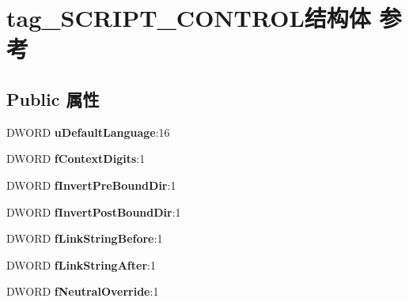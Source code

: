 \hypertarget{structtag___s_c_r_i_p_t___c_o_n_t_r_o_l}{}\section{tag\+\_\+\+S\+C\+R\+I\+P\+T\+\_\+\+C\+O\+N\+T\+R\+O\+L结构体 参考}
\label{structtag___s_c_r_i_p_t___c_o_n_t_r_o_l}
\subsection*{Public 属性}
\begin{DoxyCompactItemize}
\item 
\mbox{\label{structtag___s_c_r_i_p_t___c_o_n_t_r_o_l_aff9811a6524716dabcc5a4dffa65f6b7}} 
D\+W\+O\+RD {\bfseries u\+Default\+Language}\+:16
\item 
\mbox{\label{structtag___s_c_r_i_p_t___c_o_n_t_r_o_l_a4cf13a1c29eae283580cecc5e09a1bab}} 
D\+W\+O\+RD {\bfseries f\+Context\+Digits}\+:1
\item 
\mbox{\label{structtag___s_c_r_i_p_t___c_o_n_t_r_o_l_af7fa5afc066de4edb7b32a8a41b48dee}} 
D\+W\+O\+RD {\bfseries f\+Invert\+Pre\+Bound\+Dir}\+:1
\item 
\mbox{\label{structtag___s_c_r_i_p_t___c_o_n_t_r_o_l_a533532606bc3ff57bb6876b3ed7f6d47}} 
D\+W\+O\+RD {\bfseries f\+Invert\+Post\+Bound\+Dir}\+:1
\item 
\mbox{\label{structtag___s_c_r_i_p_t___c_o_n_t_r_o_l_a80f2e2b1475889dcea151cfb02cdd37f}} 
D\+W\+O\+RD {\bfseries f\+Link\+String\+Before}\+:1
\item 
\mbox{\label{structtag___s_c_r_i_p_t___c_o_n_t_r_o_l_ab241ec7153e32cab9dc7c87cbe731d31}} 
D\+W\+O\+RD {\bfseries f\+Link\+String\+After}\+:1
\item 
\mbox{\label{structtag___s_c_r_i_p_t___c_o_n_t_r_o_l_a0eab9a45c95ebfecfc09d018c8eb6da9}} 
D\+W\+O\+RD {\bfseries f\+Neutral\+Override}\+:1

\end{DoxyCompactItemize}

